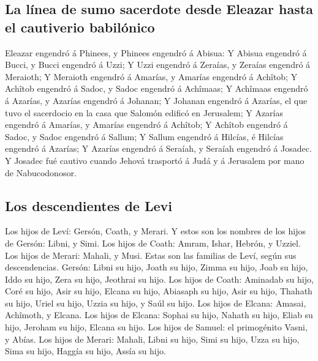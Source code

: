 \hypertarget{la-luxednea-de-sumo-sacerdote-desde-eleazar-hasta-el-cautiverio-babiluxf3nico}{%
\subsection{La línea de sumo sacerdote desde Eleazar hasta el cautiverio
babilónico}\label{la-luxednea-de-sumo-sacerdote-desde-eleazar-hasta-el-cautiverio-babiluxf3nico}}

 Eleazar engendró á Phinees, y Phinees engendró á Abisua:
 Y Abisua engendró á Bucci, y Bucci engendró á Uzzi;
 Y Uzzi engendró á Zeraías, y Zeraías engendró á Meraioth;
 Y Meraioth engendró á Amarías, y Amarías engendró á
Achîtob;  Y Achîtob engendró á Sadoc, y Sadoc engendró á
Achîmaas;  Y Achîmaas engendró á Azarías, y Azarías engendró
á Johanan;  Y Johanan engendró á Azarías, el que tuvo el
sacerdocio en la casa que Salomón edificó en Jerusalem;  Y
Azarías engendró á Amarías, y Amarías engendró á Achîtob; 
Y Achîtob engendró á Sadoc, y Sadoc engendró á Sallum;  Y
Sallum engendró á Hilcías, é Hilcías engendró á Azarías;  Y
Azarías engendró á Seraíah, y Seraíah engendró á Josadec. 
Y Josadec fué cautivo cuando Jehová trasportó á Judá y á Jerusalem por
mano de Nabucodonosor.

\hypertarget{los-descendientes-de-levi}{%
\subsection{Los descendientes de Levi}\label{los-descendientes-de-levi}}

 Los hijos de Leví: Gersón, Coath, y Merari. 
Y estos son los nombres de los hijos de Gersón: Libni, y Simi.
 Los hijos de Coath: Amram, Ishar, Hebrón, y Uzziel.
 Los hijos de Merari: Mahali, y Musi. Estas son las
familias de Leví, según sus descendencias.  Gersón: Libni
su hijo, Joath su hijo, Zimma su hijo,  Joab su hijo, Iddo
su hijo, Zera su hijo, Jeothrai su hijo.  Los hijos de
Coath: Aminadab su hijo, Coré su hijo, Asir su hijo, 
Elcana su hijo, Abiasaph su hijo, Asir su hijo,  Thahath su
hijo, Uriel su hijo, Uzzia su hijo, y Saúl su hijo.  Los
hijos de Elcana: Amasai, Achîmoth, y Elcana.  Los hijos de
Elcana: Sophai su hijo, Nahath su hijo,  Eliab su hijo,
Jeroham su hijo, Elcana su hijo.  Los hijos de Samuel: el
primogénito Vasni, y Abías.  Los hijos de Merari: Mahali,
Libni su hijo, Simi su hijo, Uzza su hijo,  Sima su hijo,
Haggía su hijo, Assía su hijo.

